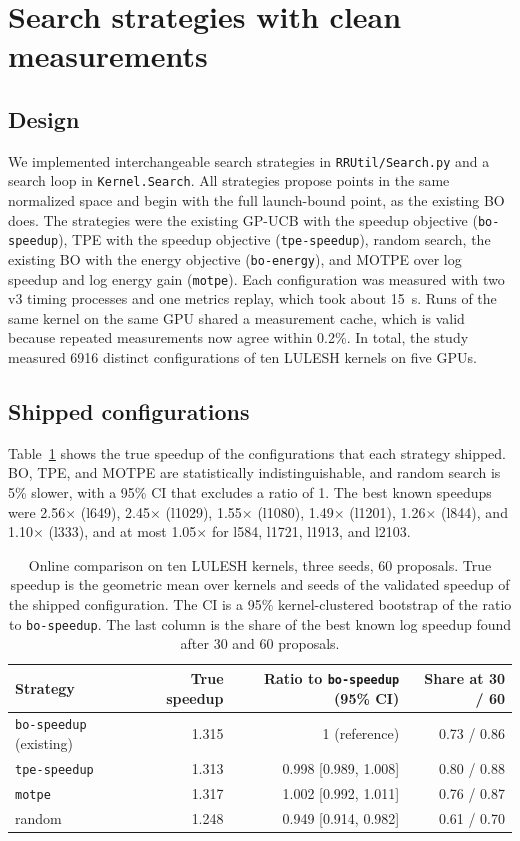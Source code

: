 \documentclass[10pt]{article}
\newcommand{\x}{\ensuremath{\times}}
\newcommand{\code}[1]{\texttt{#1}}
\begin{document}
\section{Search strategies with clean measurements}
\label{sec:search}

\subsection{Design}
We implemented interchangeable search strategies in \code{RRUtil/Search.py}
and a search loop in \code{Kernel.Search}. All strategies propose points in
the same normalized space and begin with the full launch-bound point, as the
existing BO does. The strategies were the existing GP-UCB with the speedup
objective (\code{bo-speedup}), TPE with the speedup objective
(\code{tpe-speedup}), random search, the existing BO with the energy objective
(\code{bo-energy}), and MOTPE over log speedup and log energy gain
(\code{motpe}). Each configuration was measured with two v3 timing processes
and one metrics replay, which took about 15~s. Runs of the same kernel on the
same GPU shared a measurement cache, which is valid because repeated
measurements now agree within 0.2\%. In total, the study measured 6916
distinct configurations of ten LULESH kernels on five GPUs.

\subsection{Shipped configurations}
Table~\ref{tab:search} shows the true speedup of the configurations that each
strategy shipped. BO, TPE, and MOTPE are statistically indistinguishable, and
random search is 5\% slower, with a 95\% CI that excludes a ratio of 1. The best
known speedups were 2.56\x{} (l649), 2.45\x{} (l1029), 1.55\x{} (l1080),
1.49\x{} (l1201), 1.26\x{} (l844), and 1.10\x{} (l333), and at most 1.05\x{}
for l584, l1721, l1913, and l2103.

\begin{table}[t]
\centering
\caption{Online comparison on ten LULESH kernels, three seeds, 60 proposals.
True speedup is the geometric mean over kernels and seeds of the validated
speedup of the shipped configuration. The CI is a 95\% kernel-clustered
bootstrap of the ratio to \code{bo-speedup}. The last column is the share of
the best known log speedup found after 30 and 60 proposals.}
\label{tab:search}
\begin{tabular}{lrrr}
\toprule
Strategy & True speedup & Ratio to \code{bo-speedup} (95\% CI) & Share at 30 / 60 \\
\midrule
\code{bo-speedup} (existing) & 1.315 & 1 (reference) & 0.73 / 0.86 \\
\code{tpe-speedup} & 1.313 & 0.998 [0.989, 1.008] & 0.80 / 0.88 \\
\code{motpe} & 1.317 & 1.002 [0.992, 1.011] & 0.76 / 0.87 \\
random & 1.248 & 0.949 [0.914, 0.982] & 0.61 / 0.70 \\
\bottomrule
\end{tabular}
\end{table}
\end{document}
